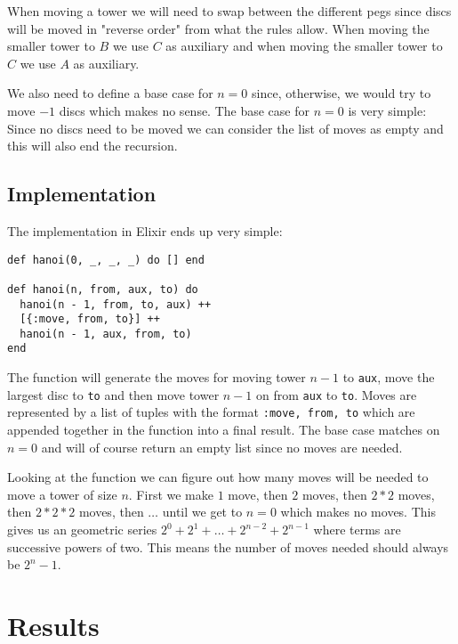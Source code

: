 \documentclass[a4paper,11pt]{article}
\begin{document}
When moving a tower we will need to swap between the different pegs since discs will be moved in "reverse order" from what the rules allow. When moving the smaller tower to $B$ we use $C$ as auxiliary and when moving the smaller tower to $C$ we use $A$ as auxiliary.

We also need to define a base case for $n=0$ since, otherwise, we would try to move $-1$ discs which makes no sense.
The base case for $n=0$ is very simple: Since no discs need to be moved we can consider the list of moves as empty and this will also end the recursion.

\subsection*{Implementation}

The implementation in Elixir ends up very simple:

\begin{verbatim}
def hanoi(0, _, _, _) do [] end

def hanoi(n, from, aux, to) do
  hanoi(n - 1, from, to, aux) ++
  [{:move, from, to}] ++
  hanoi(n - 1, aux, from, to)
end
\end{verbatim}

The function will generate the moves for moving tower $n-1$ to \texttt{aux},
move the largest disc to \texttt{to} and then move tower $n-1$ on from \texttt{aux} to \texttt{to}.
Moves are represented by a list of tuples with the format \texttt{{:move, from, to}} which are appended together in the function into a final result.
The base case matches on $n=0$ and will of course return an empty list since no moves are needed.

Looking at the function we can figure out how many moves will be needed to move a tower of size $n$.
First we make $1$ move, then $2$ moves, then $2*2$ moves, then $2*2*2$ moves, then $\ldots$ until we get to $n=0$ which makes no moves.
This gives us an geometric series $2^0 + 2^1 + \ldots + 2^{n-2} + 2^{n-1}$ where terms are successive powers of two.
This means the number of moves needed should always be $2^n - 1$.

\section*{Results}
\end{document}
